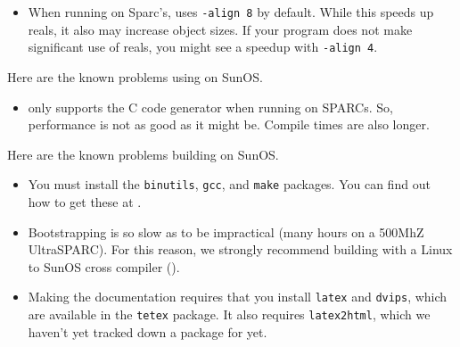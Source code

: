 
\begin{itemize}

\item
When running on Sparc's, {\mlton} uses {\tt -align 8} by default.
While this speeds up reals, it also may increase object sizes.  If
your program does not make significant use of reals, you might see a
speedup with {\tt -align 4}.

\end{itemize}

Here are the known problems using {\mlton} on SunOS.

\begin{itemize}

\item {\mlton} only supports the C code generator when running on
SPARCs. So, performance is not as good as it might be.  Compile times
are also longer.

\end{itemize}

Here are the known problems building {\mlton} on SunOS.

\begin{itemize}

\item You must install the {\tt binutils}, {\tt gcc}, and {\tt make}
packages.  You can find out how to get these at
.

\item Bootstrapping is so slow as to be impractical (many hours on a
500MhZ UltraSPARC).  For this reason, we strongly recommend building
with a Linux to SunOS cross compiler ().

\item Making the documentation requires that you install {\tt latex}
and {\tt dvips}, which are available in the {\tt tetex} package.  It
also requires {\tt latex2html}, which we haven't yet tracked down a
package for yet.

\end{itemize}
